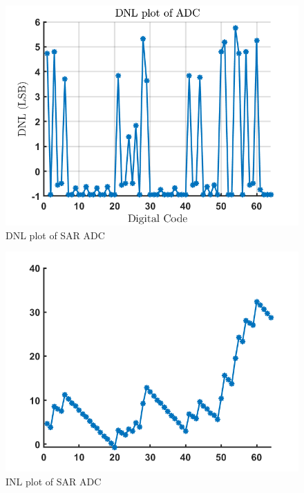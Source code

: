 \documentclass[a4paper,12pt]{article}
\begin{document}
\begin{itemize}
        \begin{figure}[H]
        \centering
        \includegraphics[max width = \textwidth]{3/DNL_SAR.png}
        \caption{DNL plot of SAR ADC}
        \label{fig:enter-label}
    \end{figure}

        \begin{figure}[H]
        \centering
        \includegraphics[max width = \textwidth]{3/3_INL.png}
        \caption{INL plot of SAR ADC}
        \label{fig:enter-label}
    \end{figure}


\end{itemize}
\end{document}

